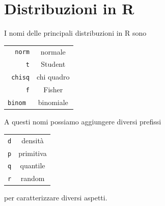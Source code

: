 \documentclass[onecolumn,12pt]{book}
\begin{document}
\section{Distribuzioni in \textsf{R}}
I nomi delle principali distribuzioni in \textsf{R} sono\vskip10pt
\begin{tabular}{|r|c |}
\hline
\texttt{norm}&normale\\
\texttt{t}  &Student\\
\texttt{chisq}& chi quadro\\
\texttt{f}&Fisher\\
\texttt{binom }&binomiale\\
\hline
\end{tabular}\vskip10pt
A questi nomi possiamo aggiungere diversi prefissi\vskip10pt
\begin{tabular}{|r|c |}
\hline
\texttt{d}&densit\`a\\
\texttt{p}  &primitiva\\
\texttt{q}& quantile\\
\texttt{r}&random\\
  \hline
\end{tabular}
\vskip10pt
per caratterizzare diversi aspetti.
\end{document}
